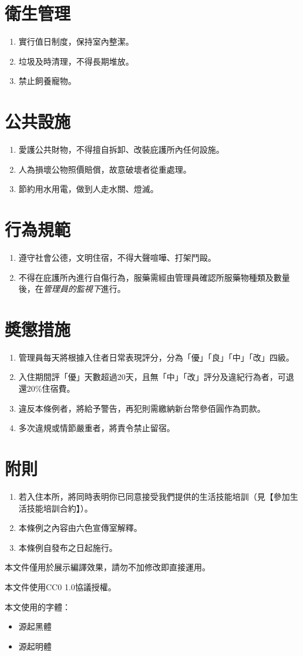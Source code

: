 \documentclass[12pt]{article}
\begin{document}
\section{衛生管理}
\begin{enumerate}
	\item 實行值日制度，保持室內整潔。
	\item 垃圾及時清理，不得長期堆放。
	\item 禁止飼養寵物。
\end{enumerate}

\section{公共設施}
\begin{enumerate}
    \item 愛護公共財物，不得擅自拆卸、改裝庇護所內任何設施。
    \item 人為損壞公物照價賠償，故意破壞者從重處理。
    \item 節約用水用電，做到人走水關、燈滅。
\end{enumerate}

\section{行為規範}
\begin{enumerate}
    \item 遵守社會公德，文明住宿，不得大聲喧嘩、打架鬥毆。
    \item 不得在庇護所內進行自傷行為，服藥需經由管理員確認所服藥物種類及數量後，在\large{\textit{管理員的監視下}}進行。
\end{enumerate}

\section{奬懲措施}
\begin{enumerate}
	\item 管理員每天將根據入住者日常表現評分，分為「優」「良」「中」「改」四級。
    \item 入住期間評「優」天數超過20天，且無「中」「改」評分及違紀行為者，可退還20\%住宿費。
    \item 違反本條例者，將給予警告，再犯則需繳納新台幣參佰圓作為罰款。
    \item 多次違規或情節嚴重者，將責令禁止留宿。
\end{enumerate}

\section{附則}
\begin{enumerate}
	\item 若入住本所，將同時表明你已同意接受我們提供的生活技能培訓（見【參加生活技能培訓合約】）。
    \item 本條例之內容由六色宣傳室解釋。
    \item 本條例自發布之日起施行。
\end{enumerate}
\newpage
本文件僅用於展示編譯效果，請勿不加修改即直接運用。

本文件使用CC0 1.0協議授權。

本文使用的字體：
\begin{itemize}
	\item 源起黑體 %
	\item 源起明體 %
\end{itemize}
\end{document}
